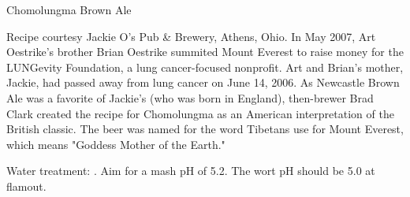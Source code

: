 \stylesection{\stylespecialtybeer}

\begin{recipie}{Chomolungma Brown Ale}

\begin{aboutblock}
Recipe courtesy Jackie O's Pub \& Brewery, Athens, Ohio.
In May 2007, Art Oestrike's brother Brian Oestrike summited Mount Everest
to raise money for the LUNG\-evity Foundation, a lung cancer-focused nonprofit.
Art and Brian's mother, Jackie, had passed away from lung cancer on June 14, 2006.
As Newcastle Brown Ale was a favorite of Jackie's (who was born in England),
then-brewer Brad Clark created the recipe for Chomolungma as an American
interpretation of the British classic. The beer was named for the word Tibetans
use for Mount Everest, which means "Goddess Mother of the Earth."
\end{aboutblock}


\begin{methodandtiming}
 
\begin{mashsteps}
\end{mashsteps}

\begin{fermentationsteps}
\end{fermentationsteps}

\begin{directions}
Water treatment: . Aim for a mash pH of 5.2.
The wort pH should be 5.0 at flamout. 
\end{directions}

\end{methodandtiming}

\pagebreak

\begin{ingredientsblock}

\begin{malts}
\end{malts}


\end{ingredientsblock}
\end{recipie}
